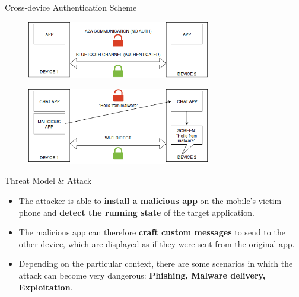 \documentclass[10pt]{beamer}
\begin{document}
 
\begin{frame}[fragile]{Cross-device Authentication Scheme}



   
  \begin{figure}[bhp]
    \centering
	\includegraphics[width=80mm]{img/2-background}
     \end{figure}

     \begin{figure}[bhp]
    \centering
	\includegraphics[width=80mm]{img/2-malware}
     \end{figure}
  
 
  
\end{frame}

\begin{frame}[fragile]{Threat Model \& Attack}

  \begin{itemize}


  \item The attacker is able to {\bf install a malicious app} on the
    mobile's victim phone and {\bf detect the running state} of the
    target application.

  \item The malicious app can therefore {\bf craft custom messages} to
    send to the other device, which are displayed as if they were sent
    from the original app.

  \item Depending on the particular context, there are some scenarios
    in which the attack can become very dangerous: {\bf Phishing,
      Malware delivery, Exploitation}.

  \end{itemize}

  
\end{frame}
\end{document}
